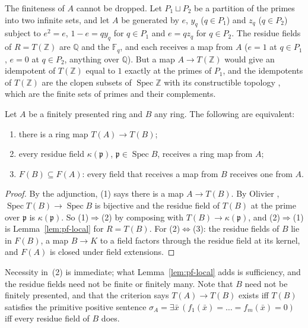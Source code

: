 The finiteness of $A$ cannot be dropped. Let $P_1\sqcup P_2$ be a partition of the primes into two infinite sets, and let $A$ be generated by $e$, $y_q$ ($q\in P_1$) and $z_q$ ($q\in P_2$) subject to $e^2 = e$, $1-e = qy_q$ for $q\in P_1$ and $e = qz_q$ for $q\in P_2$. The residue fields of $R = T(\mathbb Z)$ are $\mathbb Q$ and the $\mathbb F_q$, and each receives a map from $A$ ($e = 1$ at $q\in P_1$, $e = 0$ at $q\in P_2$, anything over $\mathbb Q$). But a map $A\to T(\mathbb Z)$ would give an idempotent of $T(\mathbb Z)$ equal to $1$ exactly at the primes of $P_1$, and the idempotents of $T(\mathbb Z)$ are the clopen subsets of $\operatorname{Spec}\mathbb Z$ with its constructible topology \cite{olivier}, which are the finite sets of primes and their complements.

\begin{theorem}[criterion]\label{th:pf-criterion}
Let $A$ be a finitely presented ring and $B$ any ring. The following are equivalent:
\begin{enumerate}
\item there is a ring map $T(A)\to T(B)$;
\item every residue field $\kappa(\mathfrak p)$, $\mathfrak p\in\operatorname{Spec}B$, receives a ring map from $A$;
\item $F(B)\subseteq F(A)$: every field that receives a map from $B$ receives one from $A$.
\end{enumerate}
\end{theorem}

\begin{proof}
By the adjunction, (1) says there is a map $A\to T(B)$. By Olivier \cite{olivier}, $\operatorname{Spec}T(B)\to\operatorname{Spec}B$ is bijective and the residue field of $T(B)$ at the prime over $\mathfrak p$ is $\kappa(\mathfrak p)$. So (1)$\Rightarrow$(2) by composing with $T(B)\to\kappa(\mathfrak p)$, and (2)$\Rightarrow$(1) is Lemma~\ref{lem:pf-local} for $R = T(B)$. For (2)$\Leftrightarrow$(3): the residue fields of $B$ lie in $F(B)$, a map $B\to K$ to a field factors through the residue field at its kernel, and $F(A)$ is closed under field extensions.
\end{proof}

Necessity in~(2) is immediate; what Lemma~\ref{lem:pf-local} adds is sufficiency, and the residue fields need not be finite or finitely many. Note that $B$ need not be finitely presented, and that the criterion says $T(A)\to T(B)$ exists iff $T(B)$ satisfies the primitive positive sentence $\sigma_A = \exists\bar x\,(f_1(\bar x) = \dots = f_m(\bar x) = 0)$ iff every residue field of $B$ does.

